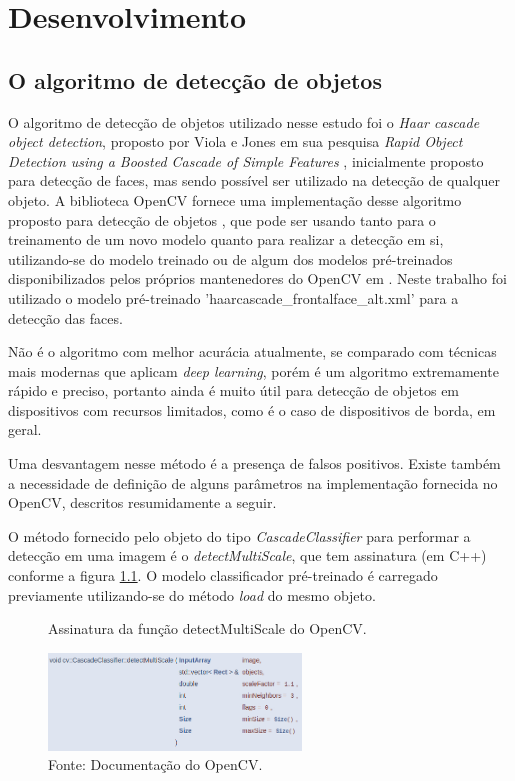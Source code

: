 \chapter{Desenvolvimento}
\thispagestyle{plain}
\label{cap:desenvolvimento}
\graphicspath{{./Cap3_Desenvolvimento/Figures/}}

\section{O algoritmo de detecção de objetos}

O algoritmo de detecção de objetos utilizado nesse estudo foi o \textit{Haar cascade object detection}, proposto por Viola e Jones em sua pesquisa \textit{Rapid Object Detection using a Boosted Cascade of Simple Features} \cite{Viola2001}, inicialmente proposto para detecção de faces, mas sendo possível ser utilizado na detecção de qualquer objeto. A biblioteca OpenCV fornece uma implementação desse algoritmo proposto para detecção de objetos \cite{OpenCV-CascadeClassifier}, que pode ser usando tanto para o treinamento de um novo modelo quanto para realizar a detecção em si, utilizando-se do modelo treinado ou de algum dos modelos pré-treinados disponibilizados pelos próprios mantenedores do OpenCV em \cite{OpenCV-PreTrainedModels}. Neste trabalho foi utilizado o modelo pré-treinado 'haarcascade\_frontalface\_alt.xml' para a detecção das faces. 

Não é o algoritmo com melhor acurácia atualmente, se comparado com técnicas mais modernas que aplicam \textit{deep learning}, porém é um algoritmo extremamente rápido e preciso, portanto ainda é muito útil para detecção de objetos em dispositivos com recursos limitados, como é o caso de dispositivos de borda, em geral.

Uma desvantagem nesse método é a presença de falsos positivos. Existe também a necessidade de definição de alguns parâmetros na implementação fornecida no OpenCV, descritos resumidamente a seguir.

O método fornecido pelo objeto do tipo \emph{CascadeClassifier} \cite{OpenCV-CascadeClassifier} para performar a detecção em uma imagem é o \emph{detectMultiScale}, que tem assinatura (em C++) conforme a figura \ref{fig:detectMultiScaleFcn}. O modelo classificador pré-treinado é carregado previamente utilizando-se do método \emph{load} do mesmo objeto.

\begin{figure}[H]
    \centering
    \caption[Assinatura da função detectMultiScale do OpenCV.]{Assinatura da função detectMultiScale do OpenCV.}
    \includegraphics[width=0.60\textwidth]{Cap3_Desenvolvimento/Figures/detectMultiScaleFcn.jpg}
    \caption*{Fonte: Documentação do OpenCV.\footnotemark}
    \label{fig:detectMultiScaleFcn}
\end{figure}

